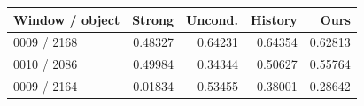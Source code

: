 \begin{tabular}{lrrrr}
\toprule
Window / object & Strong & Uncond. & History & Ours \\
\midrule
0009 / 2168 & 0.48327 & 0.64231 & 0.64354 & 0.62813 \\
0010 / 2086 & 0.49984 & 0.34344 & 0.50627 & 0.55764 \\
0009 / 2164 & 0.01834 & 0.53455 & 0.38001 & 0.28642 \\
\bottomrule
\end{tabular}
